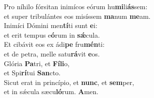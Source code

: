 \oddverse Pro níhilo fórsitan inimícos eórum hu\textbf{mi}li\textbf{ás}sem:~\*\\
\oddverse et super tribulántes eos misíssem \textbf{ma}num \textbf{me}am.\\
\evenverse Inimíci Dómini men\textbf{tí}ti sunt \textbf{e}i:~\*\\
\evenverse et erit tempus e\textbf{ó}rum in \textbf{sǽ}cula.\\
\oddverse Et cibávit eos ex ádi\textbf{pe} fru\textbf{mén}ti:~\*\\
\oddverse et de petra, melle satu\textbf{rá}vit \textbf{e}os.\\
\evenverse Glória \textbf{Pa}tri, et \textbf{Fí}\textbf{li}o,~\*\\
\evenverse et Spi\textbf{rí}tui \textbf{San}cto.\\
\oddverse Sicut erat in princípio, et \textbf{nunc}, et \textbf{sem}per,~\*\\
\oddverse et in sǽcula sæcu\textbf{ló}rum. \textbf{A}men.\\
